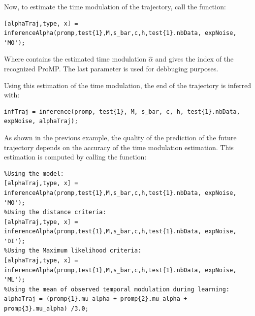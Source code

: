 \documentclass[utf8]{frontiersSCNS} %
\newcommand{\rev}[1]{\textcolor{blue}{#1}}
\newcommand{\todo}[1]{\textcolor{red}{\textbf{/*#1*/}}}
\begin{document}
Now, to estimate the time modulation of the trajectory, call the function:
\begin{lstlisting}
[alphaTraj,type, x] = inferenceAlpha(promp,test{1},M,s_bar,c,h,test{1}.nbData, expNoise, 'MO');
\end{lstlisting}
Where  contains the estimated time modulation $\hat{\alpha}$ and  gives the index of the recognized ProMP. The last parameter  is used for debbuging purposes.


Using this estimation of the time modulation, the end of the trajectory is inferred with:
\begin{lstlisting}
infTraj = inference(promp, test{1}, M, s_bar, c, h, test{1}.nbData, expNoise, alphaTraj);
\end{lstlisting}
%



As shown in the previous example, the quality of the prediction of the future trajectory depends on the accuracy of the time modulation estimation. This estimation is computed by calling the function: 
\begin{lstlisting}
%Using the model:
[alphaTraj,type, x] = inferenceAlpha(promp,test{1},M,s_bar,c,h,test{1}.nbData, expNoise, 'MO');
%Using the distance criteria:
[alphaTraj,type, x] = inferenceAlpha(promp,test{1},M,s_bar,c,h,test{1}.nbData, expNoise, 'DI');
%Using the Maximum likelihood criteria:
[alphaTraj,type, x] = inferenceAlpha(promp,test{1},M,s_bar,c,h,test{1}.nbData, expNoise, 'ML');
%Using the mean of observed temporal modulation during learning:
alphaTraj = (promp{1}.mu_alpha + promp{2}.mu_alpha + promp{3}.mu_alpha) /3.0;  
\end{lstlisting}
\end{document}
